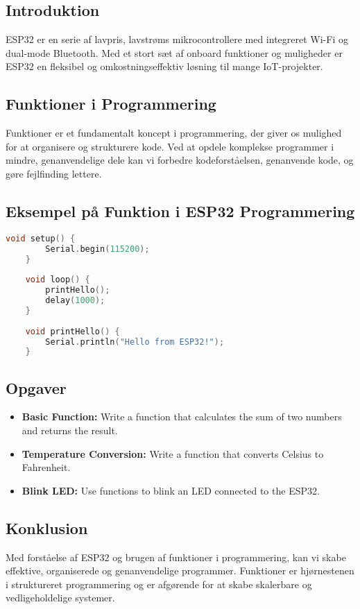 \subsection*{Introduktion}
ESP32 er en serie af lavpris, lavstrøms mikrocontrollere med integreret Wi-Fi og dual-mode Bluetooth. Med et stort sæt af onboard funktioner og muligheder er ESP32 en fleksibel og omkostningseffektiv løsning til mange IoT-projekter.

\subsection*{Funktioner i Programmering}
Funktioner er et fundamentalt koncept i programmering, der giver os mulighed for at organisere og strukturere kode. Ved at opdele komplekse programmer i mindre, genanvendelige dele kan vi forbedre kodeforståelsen, genanvende kode, og gøre fejlfinding lettere.

\subsection*{Eksempel på Funktion i ESP32 Programmering}

\begin{lstlisting}[language=C++, caption=Using a function in ESP32 code]
	void setup() {
		Serial.begin(115200);
	}
	
	void loop() {
		printHello();
		delay(1000);
	}
	
	void printHello() {
		Serial.println("Hello from ESP32!");
	}
\end{lstlisting}

\subsection*{Opgaver}
\begin{itemize}
	\item \textbf{Basic Function:} Write a function that calculates the sum of two numbers and returns the result.
	\item \textbf{Temperature Conversion:} Write a function that converts Celsius to Fahrenheit.
	\item \textbf{Blink LED:} Use functions to blink an LED connected to the ESP32.
\end{itemize}

\subsection*{Konklusion}
Med forståelse af ESP32 og brugen af funktioner i programmering, kan vi skabe effektive, organiserede og genanvendelige programmer. Funktioner er hjørnestenen i struktureret programmering og er afgørende for at skabe skalerbare og vedligeholdelige systemer.

